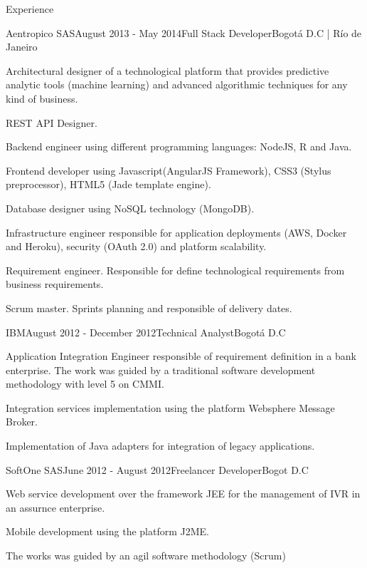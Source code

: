 \documentclass[spanish]{resume}
\begin{document}
\begin{rSection}{Experience}

\begin{rSubsection}{Aentropico SAS}{August 2013 - May 2014}{Full Stack Developer}{Bogot\'a D.C | R\'io de Janeiro}
\item Architectural designer of a technological platform that provides predictive analytic tools (machine learning) and advanced algorithmic techniques for any kind of business.
\item REST API Designer.
\item Backend engineer using different programming languages: NodeJS, R and Java.
\item Frontend developer using Javascript(AngularJS Framework), CSS3 (Stylus preprocessor), HTML5 (Jade template engine).
\item Database designer using NoSQL technology (MongoDB).
\item Infrastructure engineer responsible for application deployments (AWS, Docker and Heroku), security (OAuth 2.0) and platform scalability.
\item Requirement engineer. Responsible for define technological requirements from business requirements.
\item Scrum master. Sprints planning and responsible of delivery dates.
\end{rSubsection}


\begin{rSubsection}{IBM}{August 2012 - December 2012}{Technical Analyst}{Bogot\'a D.C}
\item Application Integration Engineer responsible of requirement definition in a bank enterprise. The work was guided by a traditional software development methodology with level 5 on CMMI.
\item Integration services implementation using the platform Websphere Message Broker.
\item Implementation of Java adapters for integration of legacy applications.
\end{rSubsection}


\begin{rSubsection}{SoftOne SAS}{June 2012 - August 2012}{Freelancer Developer}{Bogot D.C}
\item Web service development over the framework JEE for the management of IVR in an assurnce enterprise.
\item Mobile development using the platform J2ME.
\item The works was guided by an agil software methodology (Scrum)
\end{rSubsection}

\end{rSection}
\end{document}
